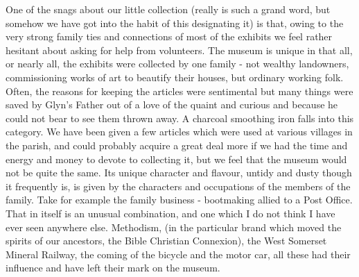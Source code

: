 One of the snags about our little collection (really  is such a grand word, but somehow we have got into the habit of this designating it) is that, owing to the very strong family ties and connections of most of the exhibits we feel rather hesitant about asking for help from volunteers. The museum is unique in that all, or nearly all, the exhibits were collected by one family - not wealthy landowners, commissioning works of art to beautify their houses, but ordinary working folk. Often, the reasons for keeping the articles were sentimental but many things were saved by Glyn's Father out of a love of the quaint and curious and because he could not bear to see them thrown away. A charcoal smoothing iron falls into this category. We have been given a few articles which were used at various villages in the parish, and could probably acquire a great deal more if we had the time and energy and money to devote to collecting it, but we feel that the museum would not be quite the same. Its unique character and flavour, untidy and dusty though it frequently is, is given by the characters and occupations of the members of the family. Take for example the family business - bootmaking allied to a Post Office. That in itself is an unusual combination, and one which I do not think I have ever seen anywhere else. Methodism, (in the particular brand which moved the spirits of our ancestors, the Bible Christian Connexion), the West Somerset Mineral Railway, the coming of the bicycle and the motor car, all these had their influence and have left their mark on the museum.

